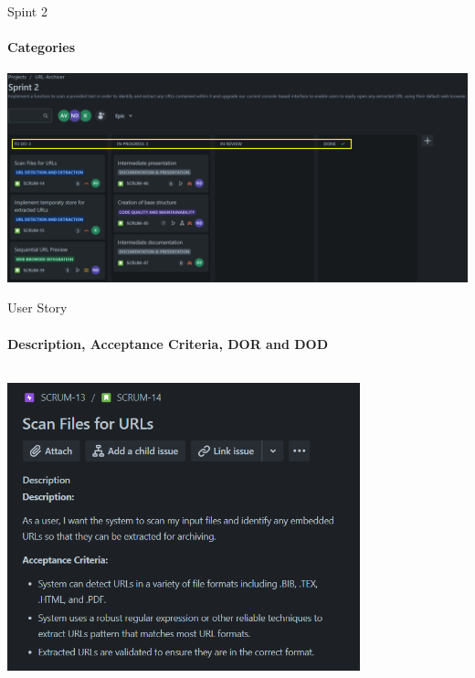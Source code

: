\documentclass[
    ngerman,%
    authorontitle=true,
]{bfhbeamer}
\begin{document}
    \begin{frame}{Spint 2}
        \framesubtitle{Categories}
        \includegraphics[width=1\textwidth]{pictures/sprint_2_cat}
    \end{frame}

    \begin{frame}{User Story}
        \framesubtitle{Description, Acceptance Criteria, DOR and DOD}
        \begin{columns}
            \begin{column}{0.6\textwidth}
                \begin{center}
                    \includegraphics[width=0.8\textwidth]{pictures/user_story_1}
                \end{center}
            \end{column}
            \begin{column}{0.4\textwidth}
                \begin{center}

\end{center}
\end{column}
\end{columns}
\end{frame}
\end{document}
